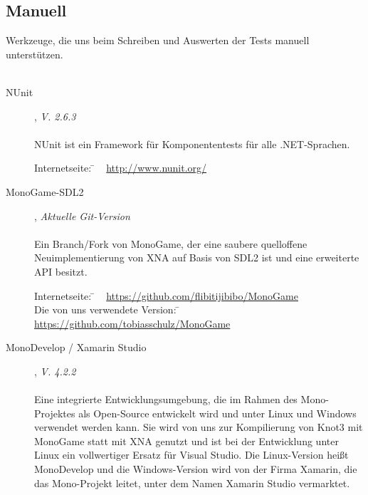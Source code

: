 
\subsection{Manuell}
\label{Abschnitt:Programmfehler:Werkzeuge:Manuell}

Werkzeuge, die uns beim Schreiben und Auswerten der Tests manuell unterstützen.
\\
\\

\begin{description}

	\item[NUnit], \textit{V. 2.6.3}\hfill
	\\
	\\
	NUnit ist ein Framework für Komponententests für alle .NET-Sprachen.
	
	\begin{tabbing}
		Internetseite:
		\= ~ \href {http://www.nunit.org/}
	    	       {http://www.nunit.org/}
	    \\
	\end{tabbing}
	
	\item[MonoGame-SDL2], \textit{Aktuelle Git-Version}\hfill
	\\
	\\
	Ein Branch/Fork von MonoGame, der eine saubere quelloffene Neuimplementierung von XNA auf Basis von SDL2 ist und eine erweiterte API besitzt.
	
	\begin{tabbing}
		Internetseite:
		\= ~ \href {https://github.com/flibitijibibo/MonoGame}
	    	       {https://github.com/flibitijibibo/MonoGame}
	    \\
		Die von uns verwendete Version:
		\= ~ \href {https://github.com/tobiasschulz/MonoGame}
	    	       {https://github.com/tobiasschulz/MonoGame}
	    \\
	\end{tabbing}
	
	\item[MonoDevelop / Xamarin Studio], \textit{V. 4.2.2}\hfill
	\\
	\\
	Eine integrierte Entwicklungsumgebung, die im Rahmen des Mono-Projektes als Open-Source entwickelt wird und unter Linux und Windows verwendet werden kann.
	Sie wird von uns zur Kompilierung von Knot3 mit MonoGame statt mit XNA genutzt und ist bei der Entwicklung unter Linux ein vollwertiger Ersatz für Visual Studio.
	Die Linux-Version heißt MonoDevelop und die Windows-Version wird von der Firma Xamarin, die das Mono-Projekt leitet, unter dem Namen Xamarin Studio vermarktet.
	

\end{description}
